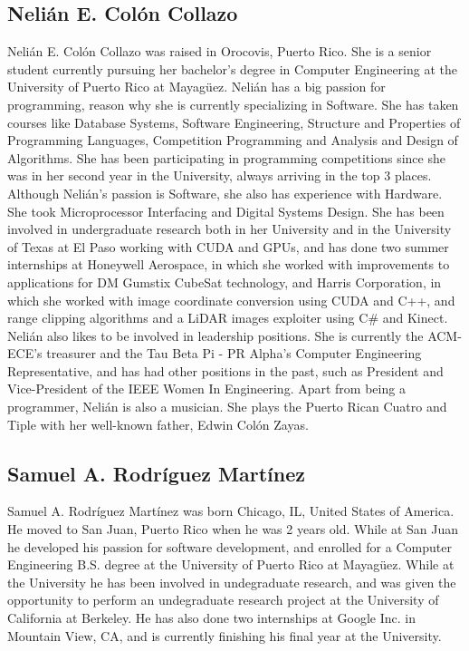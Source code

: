 \label{sec:bios}

\subsection*{Nelián E. Colón Collazo}

Nelián E. Colón Collazo was raised in Orocovis, Puerto Rico. She is a senior
student currently pursuing her bachelor's degree in Computer Engineering at the
University of Puerto Rico at Mayagüez. Nelián has a big passion for programming,
reason why she is currently specializing in Software. She has taken courses like
Database Systems, Software Engineering, Structure and Properties of 
Programming Languages, Competition Programming and Analysis and 
Design of Algorithms. She has been participating in programming competitions 
since she was in her second year in the University, always arriving in the top 
3 places. Although Nelián's passion is Software, she also has experience 
with Hardware. She took Microprocessor Interfacing and Digital Systems Design. 
She has been involved in undergraduate research both in her University 
and in the University of Texas at El Paso working with CUDA and GPUs, 
and has done two summer internships at Honeywell Aerospace, in which she worked 
with improvements to applications for DM Gumstix CubeSat technology, 
and Harris Corporation, in which she worked with image coordinate conversion 
using CUDA and C++, and range clipping algorithms and a LiDAR images exploiter 
using C\# and Kinect. Nelián also likes to be involved in leadership positions. 
She is currently the ACM-ECE's treasurer and the Tau Beta Pi - PR Alpha's 
Computer Engineering Representative, and has had other positions in the past, such as
President and Vice-President of the IEEE Women In Engineering. Apart from being 
a programmer, Nelián is also a musician. She plays the Puerto Rican Cuatro and Tiple 
with her well-known father, Edwin Colón Zayas.

\subsection*{Samuel A. Rodríguez Martínez}

Samuel A. Rodríguez Martínez was born Chicago, IL, United States of America. He
moved to San Juan, Puerto Rico when he was 2 years old. While at San Juan he
developed his passion for software development, and enrolled for a Computer
Engineering B.S. degree at the University of Puerto Rico at Mayagüez. While at
the University he has been involved in undegraduate research, and was given the
opportunity to perform an undegraduate research project at the University of
California at Berkeley. He has also done two internships at Google Inc. in
Mountain View, CA, and is currently finishing his final year at the University.

